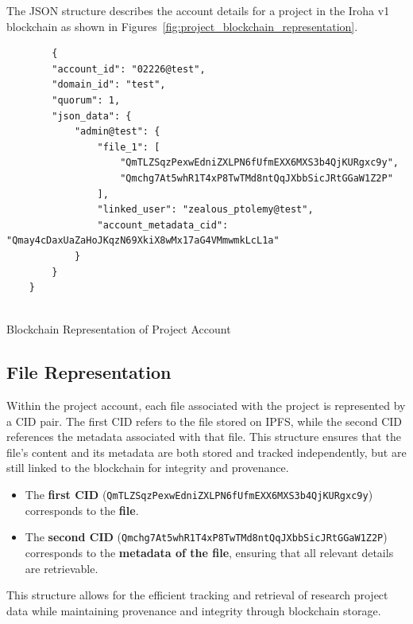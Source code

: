 \documentclass[final]{rc-book-2.14}
\begin{document}
The JSON structure describes the account details for a project in the Iroha v1 blockchain as shown in Figures~\ref{fig:project_blockchain_representation}.


\begin{listing}
\begin{verbatim}
        {
        "account_id": "02226@test",
        "domain_id": "test",
        "quorum": 1,
        "json_data": {
            "admin@test": {
                "file_1": [
                    "QmTLZSqzPexwEdniZXLPN6fUfmEXX6MXS3b4QjKURgxc9y",
                    "Qmchg7At5whR1T4xP8TwTMd8ntQqJXbbSicJRtGGaW1Z2P"
                ],
                "linked_user": "zealous_ptolemy@test",
                "account_metadata_cid": "Qmay4cDaxUaZaHoJKqzN69XkiX8wMx17aG4VMmwmkLcL1a"
            }
        }
    }
  
\end{verbatim}
\caption{Blockchain Representation of Project Account}
\label{fig:project_blockchain_representation}
\end{listing}



\subsection*{File Representation}

Within the project account, each file associated with the project is represented by a CID pair. The first CID refers to the file stored on IPFS, while the second CID references the metadata associated with that file. This structure ensures that the file's content and its metadata are both stored and tracked independently, but are still linked to the blockchain for integrity and provenance.

\begin{itemize}
    \item The \textbf{first CID} (\texttt{QmTLZSqzPexwEdniZXLPN6fUfmEXX6MXS3b4QjKURgxc9y}) corresponds to the \textbf{file}.
    \item The \textbf{second CID} (\texttt{Qmchg7At5whR1T4xP8TwTMd8ntQqJXbbSicJRtGGaW1Z2P}) corresponds to the \textbf{metadata of the file}, ensuring that all relevant details are retrievable.
\end{itemize}

This structure allows for the efficient tracking and retrieval of research project data while maintaining provenance and integrity through blockchain storage.
\end{document}

